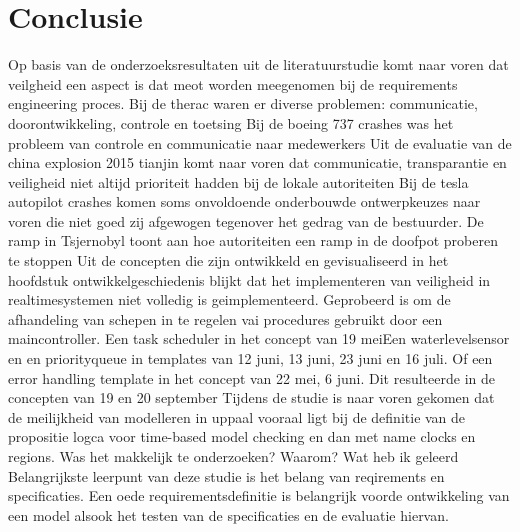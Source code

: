 \documentclass{article}
\begin{document}
	\section{Conclusie}
	
	
	
	Op basis van de onderzoeksresultaten uit de literatuurstudie komt naar voren dat veilgheid een aspect is dat meot worden meegenomen bij de requirements engineering proces.
	Bij de therac waren er diverse problemen: communicatie, doorontwikkeling, controle en toetsing
	Bij de boeing 737 crashes was het probleem van controle en communicatie naar medewerkers
	Uit de evaluatie van de china explosion 2015 tianjin komt naar voren dat communicatie, transparantie en veiligheid niet altijd prioriteit hadden bij de lokale autoriteiten
	Bij de tesla autopilot crashes komen soms onvoldoende onderbouwde ontwerpkeuzes naar voren die niet goed zij  afgewogen tegenover het gedrag van de bestuurder.
	De ramp in Tsjernobyl toont aan hoe autoriteiten een ramp in de doofpot proberen te stoppen
	Uit de concepten die zijn ontwikkeld en gevisualiseerd in  het hoofdstuk ontwikkelgeschiedenis blijkt dat het implementeren van veiligheid in  realtimesystemen niet volledig is geimplementeerd. Geprobeerd is om de afhandeling van schepen  in te regelen vai procedures gebruikt door een maincontroller. Een task scheduler in het concept van 19 meiEen waterlevelsensor en en priorityqueue in templates van 12 juni, 13 juni, 23 juni en 16 juli. Of een error handling template in het concept van 22 mei, 6 juni.
	Dit resulteerde in de concepten van 19 en 20 september
	Tijdens de studie is naar voren gekomen dat de meilijkheid van modelleren in uppaal vooraal ligt bij de definitie van de propositie logca voor time-based model checking en dan met name clocks en regions.
	Was het makkelijk te onderzoeken? Waarom?
	Wat heb ik geleerd
	Belangrijkste leerpunt van deze studie is het belang van reqirements en specificaties. Een oede requirementsdefinitie is belangrijk voorde ontwikkeling van een model alsook het testen van de specificaties en de evaluatie hiervan.
	
	
	\newpage
	
	
	\newpage
	
	
	
\end{document}
